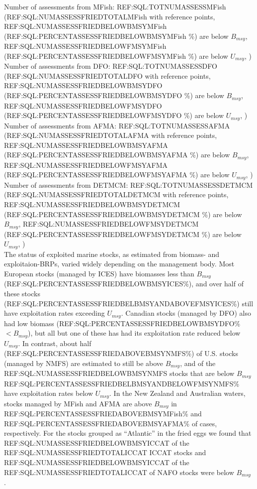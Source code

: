Number of assessments from MFish: REF:SQL:TOTNUMASSESSMFish (REF:SQL:NUMASSESSFRIEDTOTALMFish with reference points, REF:SQL:NUMASSESSFRIEDBELOWBMSYMFish (REF:SQL:PERCENTASSESSFRIEDBELOWBMSYMFish \%) are below $B_{msy}$, REF:SQL:NUMASSESSFRIEDBELOWFMSYMFish (REF:SQL:PERCENTASSESSFRIEDBELOWFMSYMFish \%) are below $U_{msy}$, ) \\
Number of assessments from DFO: REF:SQL:TOTNUMASSESSDFO (REF:SQL:NUMASSESSFRIEDTOTALDFO with reference points, REF:SQL:NUMASSESSFRIEDBELOWBMSYDFO (REF:SQL:PERCENTASSESSFRIEDBELOWBMSYDFO \%) are below $B_{msy}$, REF:SQL:NUMASSESSFRIEDBELOWFMSYDFO (REF:SQL:PERCENTASSESSFRIEDBELOWFMSYDFO \%) are below $U_{msy}$, ) \\
Number of assessments from AFMA: REF:SQL:TOTNUMASSESSAFMA (REF:SQL:NUMASSESSFRIEDTOTALAFMA with reference points, REF:SQL:NUMASSESSFRIEDBELOWBMSYAFMA (REF:SQL:PERCENTASSESSFRIEDBELOWBMSYAFMA \%) are below $B_{msy}$, REF:SQL:NUMASSESSFRIEDBELOWFMSYAFMA (REF:SQL:PERCENTASSESSFRIEDBELOWFMSYAFMA \%) are below $U_{msy}$, ) \\
Number of assessments from DETMCM: REF:SQL:TOTNUMASSESSDETMCM (REF:SQL:NUMASSESSFRIEDTOTALDETMCM with reference points, REF:SQL:NUMASSESSFRIEDBELOWBMSYDETMCM (REF:SQL:PERCENTASSESSFRIEDBELOWBMSYDETMCM \%) are below $B_{msy}$, REF:SQL:NUMASSESSFRIEDBELOWFMSYDETMCM (REF:SQL:PERCENTASSESSFRIEDBELOWFMSYDETMCM \%) are below $U_{msy}$, ) \\

The status of exploited marine stocks, as estimated from biomass- and
exploitaion-BRPs, varied widely depending on the management body. Most European stocks (managed by
ICES) have biomasses less than $B_{msy}$
(REF:SQL:PERCENTASSESSFRIEDBELOWBMSYICES\%), and over half of these
stocks (REF:SQL:PERCENTASSESSFRIEDBELBMSYANDABOVEFMSYICES\%) still
have exploitation rates exceeding $U_{msy}$. Canadian stocks (managed
by DFO) also had low biomass (REF:SQL:PERCENTASSESSFRIEDBELOWBMSYDFO\%
$< B_{msy}$), but all but one of these has had its exploitation rate
reduced below $U_{msy}$. In contrast, about half
(REF:SQL:PERCENTASSESSFRIEDABOVEBMSYNMFS\%) of U.S. stocks (managed by
NMFS) are estimated to still be above $B_{msy}$, and of the
REF:SQL:NUMASSESSFRIEDBELOWBMSYNMFS stocks that are below $B_{msy}$
REF:SQL:PERCENTASSESSFRIEDBELBMSYANDBELOWFMSYNMFS\% have exploitation
rates below $U_{msy}$. In the New
Zealand and Australian waters, stocks managed by MFish and AFMA are
above $B_{msy}$ in REF:SQL:PERCENTASSESSFRIEDABOVEBMSYMFish\% and
REF:SQL:PERCENTASSESSFRIEDABOVEBMSYAFMA\% of cases, respectively. For
the stocks grouped as ``Atlantic'' in the fried eggs we
found that REF:SQL:NUMASSESSFRIEDBELOWBMSYICCAT of the
REF:SQL:NUMASSESSFRIEDTOTALICCAT ICCAT stocks and
REF:SQL:NUMASSESSFRIEDBELOWBMSYICCAT of the
REF:SQL:NUMASSESSFRIEDTOTALICCAT of NAFO stocks were below $B_{msy}$ .

